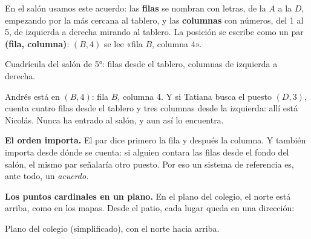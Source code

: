 \documentclass[11pt]{article}
\newcommand{\rosa}[1]{%
  \begin{scope}[shift={(#1)}, font=\scriptsize]
    \draw[->] (0,0) -- (0,0.6) node[above] {N};
    \draw (0,0) -- (0,-0.6) node[below] {S};
    \draw (0,0) -- (0.6,0) node[right] {E};
    \draw (0,0) -- (-0.6,0) node[left] {O};
  \end{scope}}
\begin{document}
En el salón usamos este acuerdo: las \textbf{filas} se nombran con letras, de la $A$ a la $D$,
empezando por la más cercana al tablero, y las \textbf{columnas} con números, del 1 al 5, de
izquierda a derecha mirando al tablero. La posición se escribe como un par
\textbf{(fila, columna)}: $(B, 4)$ se lee «fila $B$, columna 4».

\begin{center}

{\footnotesize Cuadrícula del salón de 5°: filas desde el tablero, columnas de izquierda a derecha.}
\end{center}

\begin{ejemplo}
Andrés está en $(B, 4)$: fila $B$, columna 4. Y si Tatiana busca el puesto $(D, 3)$, cuenta
cuatro filas desde el tablero y tres columnas desde la izquierda: allí está Nicolás. Nunca ha
entrado al salón, y aun así lo encuentra.
\end{ejemplo}

\textbf{El orden importa.} El par dice primero la fila y después la columna. Y también importa
desde dónde se cuenta: si alguien contara las filas desde el fondo del salón, el mismo par
señalaría otro puesto. Por eso un sistema de referencia es, ante todo, un \emph{acuerdo}.

\textbf{Los puntos cardinales en un plano.} En el plano del colegio, el norte está arriba, como
en los mapas. Desde el patio, cada lugar queda en una dirección:

\begin{center}
\begin{minipage}{\linewidth}
\centering
{}

{\footnotesize Plano del colegio (simplificado), con el norte hacia arriba.}
\end{minipage}
\end{center}
\end{document}
